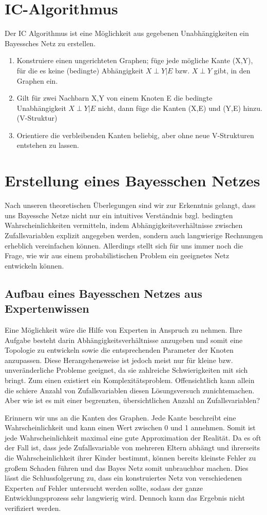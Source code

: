 \section{IC-Algorithmus}
Der IC Algorithmus ist eine Möglichkeit aus gegebenen Unabhängigkeiten ein Bayessches Netz zu erstellen.
\begin{enumerate}
\item Konstruiere einen ungerichteten Graphen; füge jede mögliche Kante (X,Y), für die es keine (bedingte) Abhängigkeit $X \perp Y | E$ bzw. $X \perp Y$ gibt, in den Graphen ein.
\item Gilt für zwei Nachbarn X,Y von einem Knoten E die bedingte Unabhängigkeit $X \perp Y | E$ nicht, dann füge die Kanten (X,E) und (Y,E) hinzu. (V-Struktur)
\item Orientiere die verbleibenden Kanten beliebig, aber ohne neue V-Strukturen entstehen zu lassen.
\end{enumerate}

\section{Erstellung eines Bayesschen Netzes}
Nach unseren theoretischen Überlegungen sind wir zur Erkenntnis gelangt, dass uns Bayessche Netze nicht nur ein intuitives Verständnis bzgl.
bedingten Wahrscheinlichkeiten vermitteln, indem Abhängigkeitsverhältnisse zwischen Zufallsvariablen explizit angegeben werden, sondern
auch langwierige Rechnungen erheblich vereinfachen können. Allerdings stellt sich für uns immer noch die Frage, wie wir aus einem
probabilistischen Problem ein geeignetes Netz entwickeln können.


\subsection{Aufbau eines Bayesschen Netzes aus Expertenwissen}   
Eine Möglichkeit wäre die Hilfe von Experten in Anspruch zu nehmen. Ihre Aufgabe besteht darin Abhängigkeitsverhältnisse anzugeben und
somit eine Topologie zu entwickeln sowie die entsprechenden Parameter der Knoten anzupassen. Diese Herangehensweise ist jedoch meist
nur für kleine bzw. unveränderliche Probleme geeignet, da sie zahlreiche Schwierigkeiten mit sich bringt.
Zum einen existiert ein Komplexitätsproblem. Offensichtlich kann allein die schiere Anzahl von Zufallsvariablen diesen Lösungsversuch
zunichtemachen. Aber wie ist es mit einer begrenzten, übersichtlichen Anzahl an Zufallsvariablen? 

Erinnern wir uns an die Kanten des Graphen. Jede Kante beschreibt eine Wahrscheinlichkeit und  kann einen Wert zwischen 0 und 1 annehmen.
Somit ist jede Wahrscheinlichkeit maximal eine gute Approximation der Realität. Da es oft der Fall ist, dass jede Zufallsvariable von
mehreren Eltern abhängt und ihrerseits die Wahrscheinlichkeit ihrer Kinder bestimmt, können bereits kleinste Fehler zu großem Schaden
führen und das Bayes Netz somit unbrauchbar machen. 
Dies lässt die Schlussfolgerung zu, dass ein konstruiertes Netz von verschiedenen Experten auf Fehler untersucht werden sollte, sodass
der ganze Entwicklungsprozess sehr langwierig wird. Dennoch kann das Ergebnis nicht verifiziert werden.

